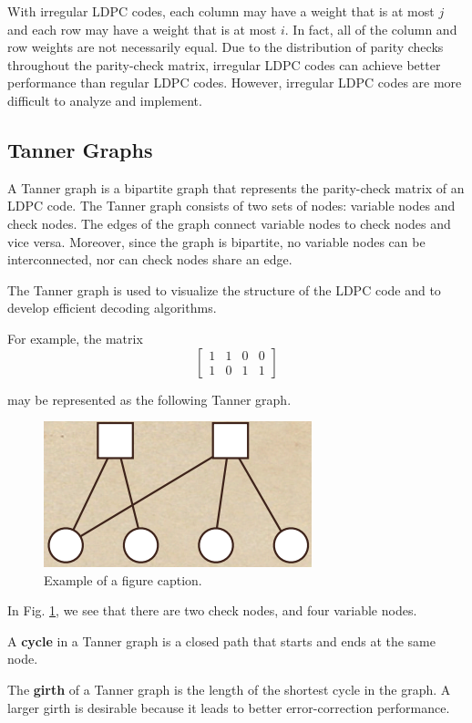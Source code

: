 \documentclass[conference]{IEEEtran}
\begin{document}
With irregular LDPC codes, each column may have a weight that is at most $j$ and each row may have a weight that is at most $i$.
In fact, all of the column and row weights are not necessarily equal.
Due to the distribution of parity checks throughout the parity-check matrix, irregular LDPC codes can achieve better performance than regular LDPC codes.
However, irregular LDPC codes are more difficult to analyze and implement.

\subsection{Tanner Graphs}
A Tanner graph is a bipartite graph that represents the parity-check matrix of
an LDPC code. The Tanner graph consists of two sets of nodes: variable nodes
and check nodes. The edges of the graph connect variable nodes to check nodes
and vice versa.
Moreover, since the graph is bipartite, no variable nodes can be interconnected, nor can check nodes share an edge.

The Tanner graph is used to visualize the structure of the LDPC code and to
develop efficient decoding algorithms.

For example, the matrix
\[
  \begin{bmatrix}
    1 & 1 & 0 & 0 \\
    1 & 0 & 1 & 1
  \end{bmatrix}
\]

may be represented as the following Tanner graph.

\begin{figure}[htbp]
  \centerline{\includegraphics{Images/tanner_graph.png}}
  \caption{Example of a figure caption.}
  \label{fig}
\end{figure}

In Fig. \ref{fig}, we see that there are two check nodes, and four variable nodes.

A \textbf{cycle} in a Tanner graph is a closed path that starts and ends at the same node.

The \textbf{girth} of a Tanner graph is the length of the shortest cycle in the graph.
A larger girth is desirable because it leads to better error-correction performance.
\end{document}
